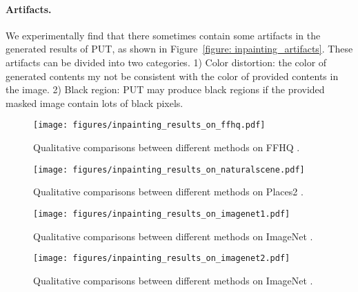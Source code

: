 \documentclass[10pt,twocolumn,letterpaper]{article}
\newcommand{\Fref}[1]{Figure~\ref{#1}}
\begin{document}
\paragraph{Artifacts.} We experimentally find that there sometimes contain some artifacts in the generated results of PUT, as shown in \Fref{figure: inpainting_artifacts}. These artifacts can be divided into two categories. 1) Color distortion: the color of generated contents my not be consistent with the color of provided contents in the image. 2) Black region: PUT may produce black regions if the provided masked image contain lots of black pixels. 


\begin{figure*}[t]
	\centering
	\texttt{[image: figures/inpainting\_results\_on\_ffhq.pdf]} 
	\caption{Qualitative comparisons between different methods on FFHQ \cite{karras2019style}.}
	\label{figure: inpainting_results_on_ffhq}
\end{figure*}



\begin{figure*}[t]
	\centering
	\texttt{[image: figures/inpainting\_results\_on\_naturalscene.pdf]} 
	\caption{Qualitative comparisons between different methods on Places2 \cite{zhou2017places}.}
	\label{figure: inpainting_results_on_naturalscene}
\end{figure*}


\begin{figure*}[t]
	\centering
	\texttt{[image: figures/inpainting\_results\_on\_imagenet1.pdf]} 
	\caption{Qualitative comparisons between different methods on ImageNet \cite{deng2009imagenet}.}
	\label{figure: inpainting_results_on_imagenet1}
\end{figure*}


\begin{figure*}[t]
	\centering
	\texttt{[image: figures/inpainting\_results\_on\_imagenet2.pdf]} 
	\caption{Qualitative comparisons between different methods on ImageNet \cite{deng2009imagenet}.}
	\label{figure: inpainting_results_on_imagenet2}
\end{figure*}
\end{document}
